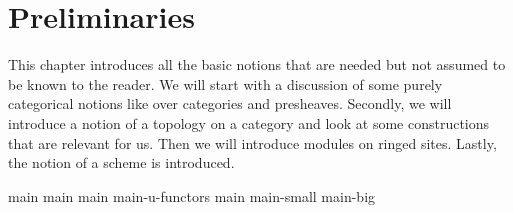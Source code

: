 \chapter{Preliminaries}
This chapter introduces all the basic notions that are needed but not assumed to be known to the reader.
We will start with a discussion of some purely categorical notions like over categories and presheaves.
Secondly, we will introduce a notion of a topology on a category and look at some constructions that are relevant for us.
Then we will introduce modules on ringed sites.
Lastly, the notion of a scheme is introduced.

{main}
{main}
{main}
{main-u-functors}
{main}
{main-small}
{main-big}
